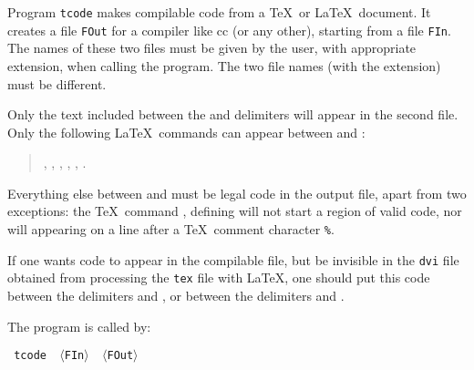 
\iffalse
 Le programme {\tt tcode} permet de produire du code compilable
\`a partir d'une documentation destin\'ee \`a TEX ou LATEX.
Il produit un fichier {\tt FOut} destin\'e \`a un compilateur tel que Modula-2
(ou autre), \`a partir d'un fichier {\tt FIn} re\c cu \`a l'entr\'ee.
Les noms de ces deux fichiers sont donn\'es par l'usager, avec l'extension,
lors de l'appel du programme.
N'appara\^\i tront dans le second fichier que les parties se trouvant entre
les d\'elimiteurs {\tt\bs{code}} et {\tt\bs{endcode}}.
Toutes les autres commandes TEX et LATEX, m\^eme \`a l'int\'erieur de ces
d\'elimiteurs, seront aussi enlev\'ees.
L'appel se fait sous la forme:
\fi


Program {\tt tcode} makes compilable code from a \TeX\  or \LaTeX\ document. It
creates a file {\tt FOut} for a compiler like cc (or any other), starting
from a file {\tt FIn}. The names of these two files must be given by the user,
with appropriate extension, when calling the program.
The two file names (with the extension) must be different.

Only the text included between the {\tt{}} and 
{\tt{}} delimiters will appear in the second file. Only the following
\LaTeX\  commands can appear between {\tt{}} and {\tt{}}:

\begin{verse}
 {\tt{}}, {\tt{}}, {\tt{}}, {\tt{}},
  {\tt{}},   {\tt{}}.
\end{verse}

  Everything else between
{\tt{}} and {\tt{}} must be legal code in the 
output file, apart from two exceptions: the \TeX\  command
 {\tt{}}, defining  {\tt{}} will not start a region
 of valid code, nor will  {\tt{}} appearing on a line after a
 \TeX\  comment character {\tt\%}.

 If one wants code to appear in the compilable file, but
 be invisible in the {\tt dvi} file obtained from processing the {\tt tex}
file with \LaTeX, one should put this code between the delimiters
{\tt{}} and {\tt{}}, or between the delimiters
{\tt{}} and {\tt{}}.

The program is called by:

\begin {center}\tt
  tcode \ $\langle$FIn$\rangle$ \ $\langle$FOut$\rangle$
\end {center}

